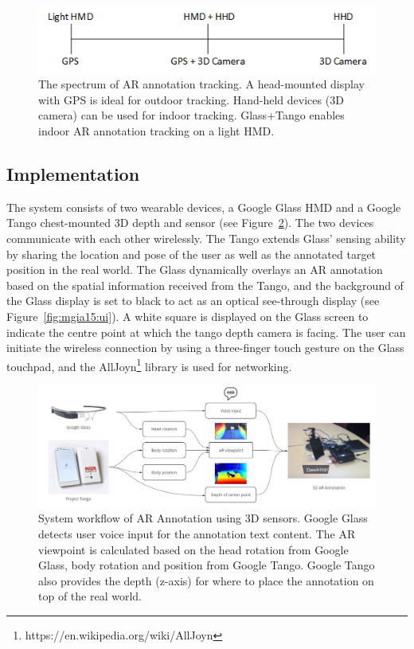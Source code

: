 \begin{figure}[ht]
  \centering
  \includegraphics[width=0.8\linewidth]{images/62-3d-mgia15/tango_paper_continuum.png}
  \caption{The spectrum of AR annotation tracking. A head-mounted display with GPS is ideal for outdoor tracking. Hand-held devices (3D camera) can be used for indoor tracking. Glass+Tango enables indoor AR annotation tracking on a light HMD.}
  \label{fig:mgia15:spectrum}
\end{figure}

\subsection{Implementation}

The system consists of two wearable devices, a Google Glass HMD and a Google Tango chest-mounted 3D depth and sensor (see Figure~\ref{fig:mgia15:framework}). The two devices communicate with each other wirelessly. The Tango extends Glass' sensing ability by sharing the location and pose of the user as well as the annotated target position in the real world. The Glass dynamically overlays an AR annotation based on the spatial information received from the Tango, and the background of the Glass display is set to black to act as an optical see-through display (see Figure~\ref{fig:mgia15:ui}). A white square is displayed on the Glass screen to indicate the centre point at which the tango depth camera is facing. The user can initiate the wireless connection by using a three-finger touch gesture on the Glass touchpad, and the AllJoyn\footnote{https://en.wikipedia.org/wiki/AllJoyn} library is used for networking.

\begin{figure}[ht]
  \centering
  \includegraphics[width=\linewidth]{images/62-3d-mgia15/mgia2015-system.jpg}
  \caption{System workflow of AR Annotation using 3D sensors. Google Glass detects user voice input for the annotation text content. The AR viewpoint is calculated based on the head rotation from Google Glass, body rotation and position from Google Tango. Google Tango also provides the depth (z-axis) for where to place the annotation on top of the real world.}
  \label{fig:mgia15:framework}
\end{figure}

